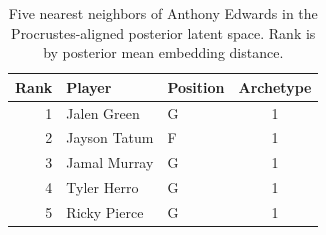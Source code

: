 \begin{table}[htbp]
  \centering\small
  \begin{tabular}{rllc}
    \toprule
    Rank & Player & Position & Archetype \\
    \midrule
    1 & Jalen Green & G & 1 \\
    2 & Jayson Tatum & F & 1 \\
    3 & Jamal Murray & G & 1 \\
    4 & Tyler Herro & G & 1 \\
    5 & Ricky Pierce & G & 1 \\
    \bottomrule
  \end{tabular}
  \caption{Five nearest neighbors of Anthony Edwards in the Procrustes-aligned posterior latent space. Rank is by posterior mean embedding distance.}
  \label{tab:Anthony_Edwards_neighbors}
\end{table}


